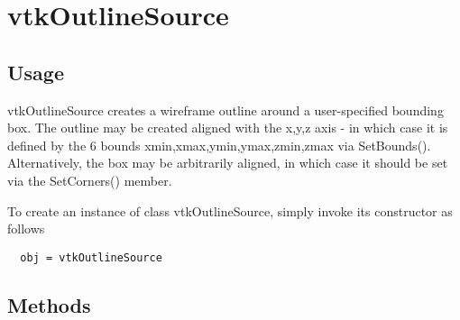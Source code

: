 \section{vtkOutlineSource}

\subsection{Usage}

 vtkOutlineSource creates a wireframe outline around a
 user-specified bounding box.  The outline may be created aligned
 with the {x,y,z} axis - in which case it is defined by the 6 bounds
 {xmin,xmax,ymin,ymax,zmin,zmax} via SetBounds(). Alternatively, the
 box may be arbitrarily aligned, in which case it should be set via
 the SetCorners() member.

To create an instance of class vtkOutlineSource, simply
invoke its constructor as follows
\begin{verbatim}
  obj = vtkOutlineSource
\end{verbatim}
\subsection{Methods}

